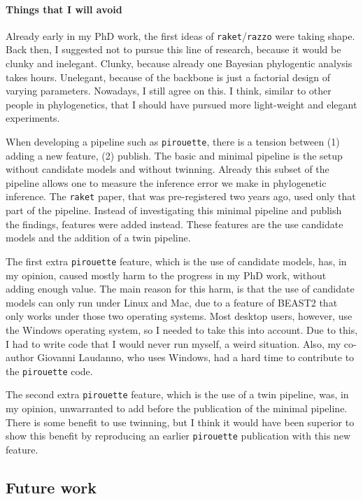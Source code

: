 \paragraph{Things that I will avoid} 

Already early in my PhD work, the first ideas of \verb;raket;/\verb;razzo; were
taking shape. Back then, I suggested not to pursue this line of
research, because it would be clunky and inelegant. Clunky, because
already one Bayesian phylogentic analysis takes hours. Unelegant,
because of the backbone is just a factorial design of varying
parameters. Nowadays, I still agree on this.
I think, similar to other people in phylogenetics,
that I should have pursued more light-weight and elegant experiments.

When developing a pipeline such as \verb;pirouette;, there is a tension
between (1) adding a new feature, (2) publish. The basic
and minimal pipeline is the setup without candidate models and without
twinning. Already this subset of the pipeline allows one to 
measure the inference error we make in phylogenetic inference.
The \verb;raket; paper, that was pre-registered two years ago, used only
that part of the pipeline. Instead of investigating this minimal
pipeline and publish the findings, features were added instead.
These features are the use candidate models and the addition
of a twin pipeline. 

The first extra \verb;pirouette; feature, which is the use of candidate models,
has, in my opinion, caused mostly harm to the progress in my PhD work, without adding
enough value. The main reason for this harm, is that the use of candidate
models can only run under Linux and Mac, due to a feature of BEAST2 that
only works under those two operating systems. Most desktop users, however,
use the Windows operating system, so I needed to take this into account.
Due to this, I had to write code that I would never run myself, a weird
situation. Also, my co-author Giovanni Laudanno, who uses Windows, had
a hard time to contribute to the \verb;pirouette; code. 

The second extra \verb;pirouette; feature, which is the use of a twin pipeline,
was, in my opinion, unwarranted to add before the publication of the minimal
pipeline. There is some benefit to use twinning, but I think 
it would have been superior to show this benefit by reproducing an earlier
\verb;pirouette; publication with this new feature.

\subsection{Future work}

